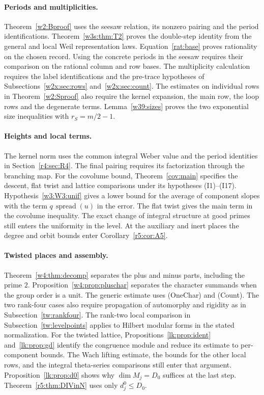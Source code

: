 \paragraph{Periods and multiplicities.}\label{fr:sec:frame}
Theorem~\ref{w2:Bproof} uses the seesaw relation, its nonzero pairing
and the period identifications. Theorem~\ref{w3s:thm:T2} proves the
double-step identity from the general and local Weil representation
laws. Equation~\eqref{rat:base} proves rationality on the chosen record.
Using the concrete periods in the seesaw requires their comparison
on the rational column and row bases. The multiplicity calculation requires the
label identifications and the pre-trace hypotheses of
Subsections~\ref{w2x:sec:rows} and~\ref{w2x:sec:count}.
The estimates on individual rows in Theorem~\ref{w2:Sproof} also
require the kernel expansion, the main row, the loop rows and the
degenerate terms. Lemma~\ref{w39:sizes} proves the two exponential
size inequalities with $r_S=m/2-1$.

\paragraph{Heights and local terms.}\label{fr:sec:heights}\label{fr:sec:local}
The kernel norm uses the common integral Weber value and the period
identities in Section~\ref{r4:sec:R4}. The final pairing requires its
factorization through the branching map. For the covolume bound,
Theorem~\ref{cov:main} specifies the descent, flat twist and lattice
comparisons under its hypotheses (I1)--(I17).
Hypothesis~\ref{w3:W3:unif} gives a lower bound for the average of
component slopes with the term $q\,\operatorname{spread}(u)$ in the
error. The flat twist gives the main term in the covolume inequality.
The exact change of integral structure at good primes still enters the
uniformity in the level. At the auxiliary and inert places the degree
and orbit bounds enter Corollary~\ref{r5:cor:A5}.

\paragraph{Twisted places and assembly.}\label{fr:sec:twisted}\label{fr:sec:assembly}
Theorem~\ref{w4:thm:decomp} separates the plus and minus parts, including
the prime $2$. Proposition~\ref{w4:prop:pluschar} separates the character
summands when the group order is a unit. The generic estimate uses
(OneChar) and (Count). The two rank-four cases also require propagation
of automorphy and rigidity as in Subsection~\ref{tw:rankfour}.
The rank-two local comparison in Subsection~\ref{tw:levelpoints} applies
to Hilbert modular forms in the stated normalization.
For the twisted lattice, Propositions~\ref{lk:prop:ident} and~\ref{lk:prop:gd}
identify the congruence module and reduce its estimate to per-component
bounds. The Wach lifting estimate, the bounds for the other local rows,
and the integral theta-series comparisons still enter that argument.
Proposition~\ref{lk:prop:d0} shows why $\dim M_j=D_0$ suffices at the
last step. Theorem~\ref{r5:thm:DIVinN} uses only $d^0_j\le D_0$.

